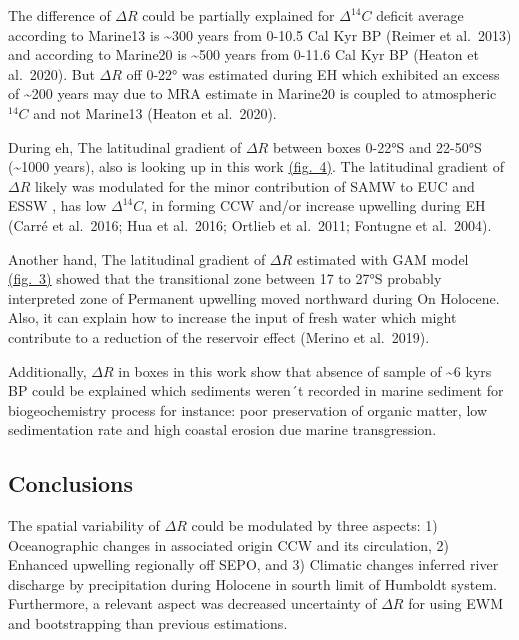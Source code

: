 \documentclass[
]{article}
\begin{document}
The difference of \(\Delta R\) could be partially explained for
\(\Delta^{14}C\) deficit average according to Marine13 is
\textasciitilde300 years from 0-10.5 Cal Kyr BP (Reimer et al.~2013) and
according to Marine20 is \textasciitilde500 years from 0-11.6 Cal Kyr BP
(Heaton et al.~2020). But \(\Delta R\) off 0-22° was estimated during EH
which exhibited an excess of \textasciitilde200 years may due to MRA
estimate in Marine20 is coupled to atmospheric \(^{14}C\) and not
Marine13 (Heaton et al.~2020).

During eh, The latitudinal gradient of \(\Delta R\) between boxes 0-22°S
and 22-50°S (\textasciitilde1000 years), also is looking up in this work
\protect\hyperlink{local-mra-estimated-under-marine20}{(fig.~4)}. The
latitudinal gradient of \(\Delta R\) likely was modulated for the minor
contribution of SAMW to EUC and ESSW , has low \(\Delta^{14}C\), in
forming CCW and/or increase upwelling during EH (Carré et al.~2016; Hua
et al.~2016; Ortlieb et al.~2011; Fontugne et al.~2004).

Another hand, The latitudinal gradient of \(\Delta R\) estimated with
GAM model
\protect\hyperlink{latitudinal-distGribution-of-mra-off-peru-to-chile}{(fig.~3)}
showed that the transitional zone between 17 to 27°S probably
interpreted zone of Permanent upwelling moved northward during On
Holocene. Also, it can explain how to increase the input of fresh water
which might contribute to a reduction of the reservoir effect (Merino et
al.~2019).

Additionally, \(\Delta R\) in boxes in this work show that absence of
sample of \textasciitilde6 kyrs BP could be explained which sediments
weren´t recorded in marine sediment for biogeochemistry process for
instance: poor preservation of organic matter, low sedimentation rate
and high coastal erosion due marine transgression.

\hypertarget{conclusions}{%
\subsection{Conclusions}\label{conclusions}}

The spatial variability of \(\Delta R\) could be modulated by three
aspects: 1) Oceanographic changes in associated origin CCW and its
circulation, 2) Enhanced upwelling regionally off SEPO, and 3) Climatic
changes inferred river discharge by precipitation during Holocene in
sourth limit of Humboldt system. Furthermore, a relevant aspect was
decreased uncertainty of \(\Delta R\) for using EWM and bootstrapping
than previous estimations.
\end{document}
